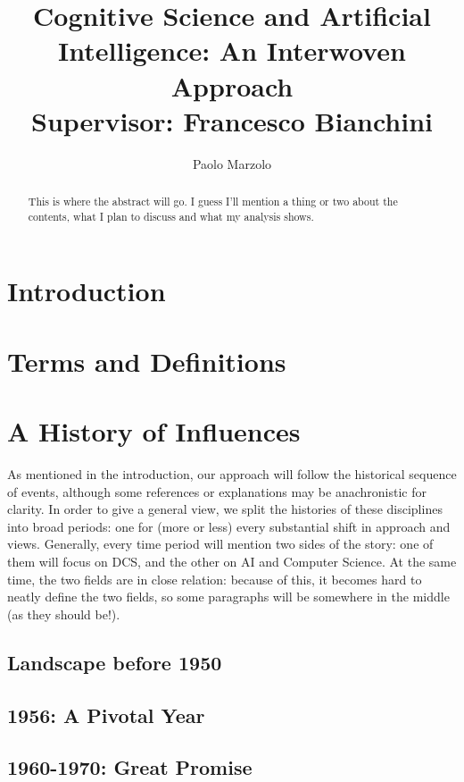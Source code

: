 \documentclass[oneside]{report}
\title{Cognitive Science and Artificial Intelligence: An Interwoven Approach \\
\large Supervisor: Francesco Bianchini}
\author{Paolo Marzolo}
\begin{document}
\begin{abstract}
    This is where the abstract will go. I guess I'll mention a thing or two about the contents, what I plan to discuss and what my analysis shows.
\end{abstract}

\maketitle
\newpage

\tableofcontents
\newpage

\chapter{Introduction}


\chapter{Terms and Definitions}


\chapter{A History of Influences}
As mentioned in the introduction, our approach will follow the historical sequence of events, although some references or explanations may be anachronistic for clarity. In order to give a general view, we split the histories of these disciplines into broad periods: one for (more or less) every substantial shift in approach and views. Generally, every time period will mention two sides of the story: one of them will focus on DCS, and the other on AI and Computer Science. At the same time, the two fields are in close relation: because of this, it becomes hard to neatly define the two fields, so some paragraphs will be somewhere in the middle (as they should be!).

\section{Landscape before 1950}


\section{1956: A Pivotal Year}


\section{1960-1970: Great Promise}

\end{document}
